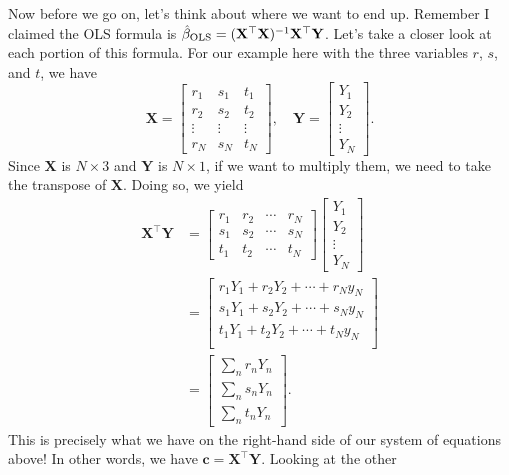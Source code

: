 \documentclass[12pt,oneside,openany]{book}
\begin{document}
Now before we go on, let's think about where we want to end up. Remember
I claimed the OLS formula is
\(\hat{\beta}_{\text{OLS}} = (\mathbf{X}^\top \mathbf{X})^{-1} \mathbf{X}^\top \mathbf{Y}\).
Let's take a closer look at each portion of this formula. For our
example here with the three variables \(r\), \(s\), and \(t\), we have
\[
\mathbf{X} = \begin{bmatrix}
r_1 & s_1 & t_1 \\
r_2 & s_2 & t_2 \\
\vdots & \vdots & \vdots \\
r_N & s_N & t_N
\end{bmatrix}, \quad
\mathbf{Y} = \begin{bmatrix}
Y_1 \\ Y_2 \\ \vdots \\ Y_N
\end{bmatrix}.
\] Since \(\mathbf{X}\) is \(N \times 3\) and \(\mathbf{Y}\) is
\(N \times 1\), if we want to multiply them, we need to take the
transpose of \(\mathbf{X}\). Doing so, we yield \[
\begin{aligned}
\mathbf{X}^\top \mathbf{Y}
&= \begin{bmatrix}
r_1 & r_2 & \cdots & r_N \\
s_1 & s_2 & \cdots & s_N \\
t_1 & t_2 & \cdots & t_N
\end{bmatrix} \begin{bmatrix}
Y_1 \\ Y_2 \\ \vdots \\ Y_N
\end{bmatrix} \\
&= \begin{bmatrix}
r_1 Y_1 + r_2 Y_2 + \cdots + r_N y_N \\
s_1 Y_1 + s_2 Y_2 + \cdots + s_N y_N \\
t_1 Y_1 + t_2 Y_2 + \cdots + t_N y_N \\
\end{bmatrix} \\
&= \begin{bmatrix}
\sum_n r_n Y_n \\ \sum_n s_n Y_n \\ \sum_n t_n Y_n
\end{bmatrix}.
\end{aligned}
\] This is precisely what we have on the right-hand side of our system
of equations above! In other words, we have
\(\mathbf{c} = \mathbf{X}^\top \mathbf{Y}\). Looking at the other
\end{document}
